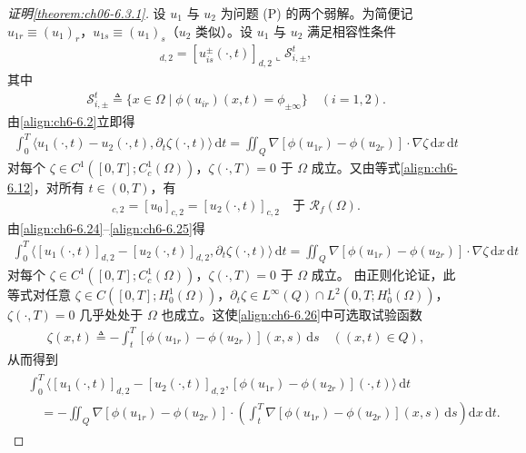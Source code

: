 \documentclass[../../main.tex]{subfiles}%
\begin{document}
\begin{proof}[证明\cref{theorem:ch06-6.3.1}]
设 $u_1$ 与 $u_2$ 为问题 (P) 的两个弱解。为简便记 $u_{1r}\equiv(u_1)_r$，$u_{1s}\equiv(u_1)_s$（$u_2$ 类似）。设 $u_1$ 与 $u_2$ 满足相容性条件
\begin{align}
[u^\pm_{is}(\cdot,t)]_{d,2}=[u^\pm_{is}(\cdot,t)]_{d,2}\llcorner\mathscr{S}^t_{i,\pm}, \label{align:ch6-6.23}
\end{align}
其中
\begin{align*}
\mathscr{S}^t_{i,\pm}\triangleq \{x\in\Omega\mid\phi(u_{ir})(x,t)=\phi_{\pm\infty}\}\quad(i=1,2).
\end{align*}
由\eqref{align:ch6-6.2}立即得
\begin{align}
\int_0^T\langle u_1(\cdot,t)-u_2(\cdot,t),\partial_t\zeta(\cdot,t)\rangle\,\mathrm{d}t
= \iint_Q\nabla[\phi(u_{1r})-\phi(u_{2r})]\cdot\nabla\zeta\,\mathrm{d}x\,\mathrm{d}t \label{align:ch6-6.24}
\end{align}
对每个 $\zeta\in C^1([0,T];C^1_c(\Omega))$，$\zeta(\cdot,T)=0$ 于 $\Omega$ 成立。又由等式\eqref{align:ch6-6.12}，对所有 $t\in(0,T)$，有
\begin{align}
[u_1(\cdot,t)]_{c,2}=[u_0]_{c,2}=[u_2(\cdot,t)]_{c,2} \quad\text{于 }\mathscr{R}_f(\Omega). \label{align:ch6-6.25}
\end{align}
由\eqref{align:ch6-6.24}--\eqref{align:ch6-6.25}得
\begin{align}
\int_0^T\langle[u_1(\cdot,t)]_{d,2}-[u_2(\cdot,t)]_{d,2},\partial_t\zeta(\cdot,t)\rangle\,\mathrm{d}t
= \iint_Q\nabla[\phi(u_{1r})-\phi(u_{2r})]\cdot\nabla\zeta\,\mathrm{d}x\,\mathrm{d}t \label{align:ch6-6.26}
\end{align}
对每个 $\zeta\in C^1([0,T];C^1_c(\Omega))$，$\zeta(\cdot,T)=0$ 于 $\Omega$ 成立。
由正则化论证，此等式对任意 $\zeta\in C([0,T];H^1_0(\Omega))$，$\partial_t\zeta\in L^\infty(Q)\cap L^2(0,T;H^1_0(\Omega))$，$\zeta(\cdot,T)=0$ 几乎处处于 $\Omega$ 也成立。这使\eqref{align:ch6-6.26}中可选取试验函数
\begin{align*}
\zeta(x,t)\triangleq -\int_t^T[\phi(u_{1r})-\phi(u_{2r})](x,s)\,\mathrm{d}s \quad((x,t)\in Q),
\end{align*}
从而得到
\begin{align}
\begin{aligned}
&\int_0^T\langle[u_1(\cdot,t)]_{d,2}-[u_2(\cdot,t)]_{d,2},
[\phi(u_{1r})-\phi(u_{2r})](\cdot,t)\rangle\,\mathrm{d}t\\
&\quad= -\iint_Q\nabla[\phi(u_{1r})-\phi(u_{2r})]\cdot
\left(\int_t^T\nabla[\phi(u_{1r})-\phi(u_{2r})](x,s)\,\mathrm{d}s\right)\mathrm{d}x\,\mathrm{d}t.

\end{aligned}
\end{align}
\end{proof}
\end{document}
